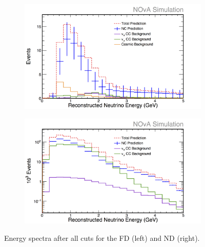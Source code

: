 \begin{figure}[h]
  \centering
  \begin{subfigure}{.48\textwidth}
    \centering
    \includegraphics[width=1\linewidth]{figures/RecoE6FD.png}
  \end{subfigure}
  \begin{subfigure}{.48\textwidth}
    \centering
    \includegraphics[width=1\linewidth]{figures/RecoE6ND.png}
  \end{subfigure}
  \caption[Energy Spectra After All Cuts]{Energy spectra after all cuts for the FD (left) and ND (right).}
  \label{fig:Sel}
\end{figure}
